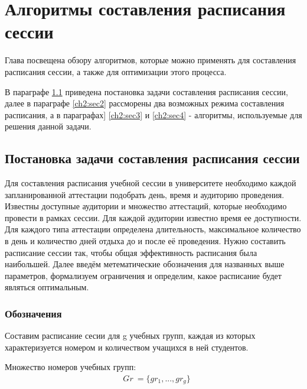 \chapter{Алгоритмы составления расписания сессии} \label{ch2}
	

Глава посвещена обзору алгоритмов, которые можно применять для составления расписания сессии, а также для оптимизации этого процесса. 

В параграфе \ref{ch2:sec1} приведена постановка задачи составления расписания сессии, далее в параграфе \ref{ch2:sec2} рассморены два возможных режима составления расписания, а в параграфах] \ref{ch2:sec3} и \ref{ch2:sec4} - алгоритмы, используемые для решения данной задачи. 

\section{Постановка задачи составления расписания сессии} \label{ch2:sec1} 

Для составления расписания учебной сессии в университете необходимо каждой запланированной аттестации подобрать день, время и аудиторию проведения. 
Известны доступные аудитории и множество аттестаций, которые необходимо провести в рамках сессии. Для каждой аудитории известно время ее доступности. Для каждого типа аттестации определена длительность, максимальное количество в день и количество дней отдыха до и после её проведения. Нужно составить расписание сессии так, чтобы общая эффективность расписания была наибольшей. Далее введём метематические обозначения для названных выше параметров, формализуем ограничения и определим, какое расписание будет являться оптимальным.

\subsection{Обозначения} 

Составим расписание сесии для g учебных групп, каждая из которых характеризуется номером и количеством учащихся в ней студентов. 

Множество номеров учебных групп: 
\begin{align}
	& Gr\ =  \{ gr_1,...,gr_g \} 
\end{align}

